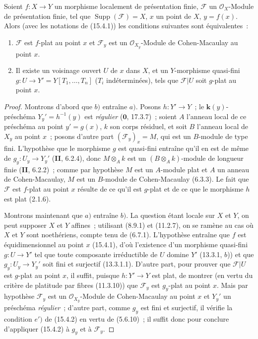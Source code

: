 \begin{proposition}[15.4.3]
\label{IV.15.4.3-fr}
Soient $f:X\to Y$ un morphisme localement de présentation finie, $\mathcal F$ un
$\mathcal O_X$-Module de présentation finie, tel que
$\operatorname{Supp}(\mathcal F)=X$, $x$ un point de $X$, $y=f(x)$. Alors \textup{(avec
les notations de (15.4.1))} les conditions suivantes sont équivalentes~:
\begin{enumerate}[label=\emph{\alph*})]
  \item $\mathcal F$ est $f$-plat au point $x$ et $\mathcal F_y$ est un
  $\mathcal O_{X_y}$-Module de Cohen-Macaulay au point $x$.
  \item Il existe un voisinage ouvert $U$ de $x$ dans $X$, et un $Y$-morphisme
  quasi-fini $g:U\to Y'=Y[T_1,\ldots,T_n]$ ($T_i$ indéterminées), tels que
  $\mathcal F|U$ soit $g$-plat au point $x$.
\end{enumerate}
\end{proposition}

\begin{proof}
Montrons d'abord que $b)$ entraîne $a)$. Posons $h:Y'\to Y$~; le
$\boldsymbol{k}(y)$-préschéma $Y_y'=h^{-1}(y)$ est \emph{régulier}
($\mathbf{0}$, 17.3.7)~; soient $A$ l'anneau local de ce préschéma
au point $y'=g(x)$, $k$ son corps résiduel, et soit $B$ l'anneau local de $X_y$
au point $x$~; posons d'autre part $(\mathcal F_y)_x=M$, qui est un $B$-module
de type fini. L'hypothèse que le morphisme $g$ est quasi-fini entraîne qu'il en
est de même de $g_y:U_y\to Y_y'$ (\textbf{II}, 6.2.4), donc $M\otimes_A k$ est
un $(B\otimes_A k)$-module de longueur finie (\textbf{II}, 6.2.2)~; comme par
hypothèse $M$ est un $A$-module plat et $A$ un anneau de Cohen-Macaulay, $M$ est
un $B$-module de Cohen-Macaulay (6.3.3). Le fait que $\mathcal F$ est $f$-plat
au point $x$ résulte de ce qu'il est $g$-plat et de ce que le morphisme $h$ est
plat (2.1.6).

Montrons maintenant que $a)$ entraîne $b)$. La question étant locale sur $X$ et
$Y$, on peut supposer $X$ et $Y$ affines~; utilisant (8.9.1) et (11.2.7), on se
ramène au cas où $X$ et $Y$ sont noethériens, compte tenu de (6.7.1).
L'hypothèse entraîne que $f$ est
équidimensionnel au point $x$ (15.4.1), d'où l'existence d'un morphisme
quasi-fini $g:U\to Y'$ tel que toute composante irréductible de $U$ domine $Y'$
(13.3.1, $b$)) et que $g_y:U_y\to Y_y'$ soit fini et surjectif (13.3.1.1).
D'autre part, pour prouver que $\mathcal F|U$ est $g$-plat au point $x$, il
suffit, puisque $h:Y'\to Y$ est plat, de montrer (en vertu du critère de
platitude par fibres (11.3.10)) que $\mathcal F_y$ est $g_y$-plat au point $x$.
Mais par hypothèse $\mathcal F_y$ est un $\mathcal O_{X_y}$-Module de
Cohen-Macaulay au point $x$ et $Y_y'$ un préschéma \emph{régulier}~; d'autre
part, comme $g_y$ est fini et surjectif, il vérifie la condition $e')$ de
(15.4.2) en vertu de (5.6.10)~; il suffit donc pour conclure d'appliquer (15.4.2)
à $g_y$ et à $\mathcal F_y$.
\end{proof}

